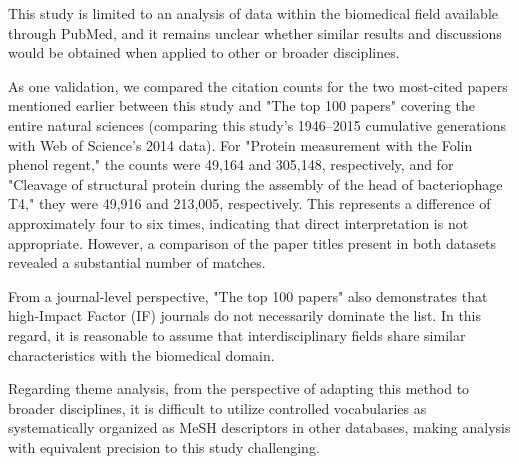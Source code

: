 This study is limited to an analysis of data within the biomedical field available through PubMed, and it remains unclear whether similar results and discussions would be obtained when applied to other or broader disciplines.

As one validation, we compared the citation counts for the two most-cited papers mentioned earlier between this study and "The top 100 papers" covering the entire natural sciences (comparing this study's 1946--2015 cumulative generations with Web of Science's 2014 data). For "Protein measurement with the Folin phenol regent," the counts were 49,164 and 305,148, respectively, and for "Cleavage of structural protein during the assembly of the head of bacteriophage T4," they were 49,916 and 213,005, respectively. This represents a difference of approximately four to six times, indicating that direct interpretation is not appropriate. However, a comparison of the paper titles present in both datasets revealed a substantial number of matches.

From a journal-level perspective, "The top 100 papers" also demonstrates that high-Impact Factor (IF) journals do not necessarily dominate the list. In this regard, it is reasonable to assume that interdisciplinary fields share similar characteristics with the biomedical domain.

Regarding theme analysis, from the perspective of adapting this method to broader disciplines, it is difficult to utilize controlled vocabularies as systematically organized as MeSH descriptors in other databases, making analysis with equivalent precision to this study challenging.

